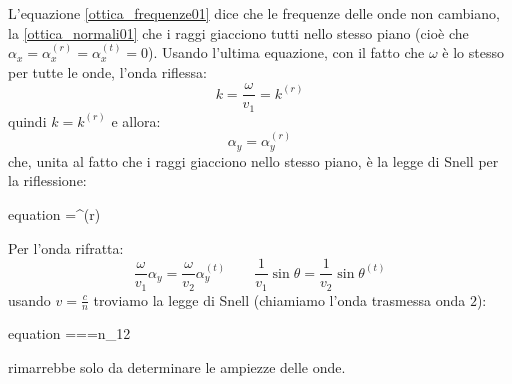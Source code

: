 L'equazione \eqref{ottica_frequenze01} dice che le frequenze delle onde non cambiano, la \eqref{ottica_normali01} che i raggi giacciono tutti nello stesso piano (cioè che $\alpha_x=\alpha_x^{(r)}=\alpha_x^{(t)}=0$). Usando l'ultima equazione, con il fatto che $\omega$ è lo stesso per tutte le onde, l'onda riflessa:
\[
  k=\frac{\omega}{v_1}=k^{(r)}
\]
quindi $k=k^{(r)}$ e allora:
\[
  \alpha_y = \alpha_y^{(r)}
\]
che, unita al fatto che i raggi giacciono nello stesso piano, è la legge di Snell per la riflessione:
\begin{eqimp}{equation}
  \theta=\theta^{(r)}
\end{eqimp}
Per l'onda rifratta:
\[
  \frac{\omega}{v_1}\alpha_y=\frac{\omega}{v_2}\alpha_y^{(t)}
  \qquad
  \frac{1}{v_1}\sin\theta=\frac{1}{v_2}\sin\theta^{(t)}
\]
usando $v=\frac{c}{n}$ troviamo la legge di Snell (chiamiamo l'onda trasmessa onda $2$):
\begin{eqimp}{equation}
  ===n_{12}
\end{eqimp}
rimarrebbe solo da determinare le ampiezze delle onde.


